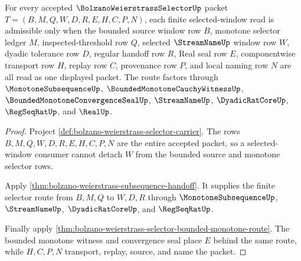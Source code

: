 \begin{theorem}
\label{thm:bolzano-weierstrass-selector-window-obligation}
For every accepted $\BolzanoWeierstrassSelectorUp$ packet $T=(B,M,Q,W,D,R,E,H,C,P,N)$, each finite selected-window read is admissible only when the bounded source window row $B$, monotone selector ledger $M$, inspected-threshold row $Q$, selected $\StreamNameUp$ window row $W$, dyadic tolerance row $D$, regular handoff row $R$, Real seal row $E$, componentwise transport row $H$, replay row $C$, provenance row $P$, and local naming row $N$ are all read as one displayed packet. The route factors through $\MonotoneSubsequenceUp$, $\BoundedMonotoneCauchyWitnessUp$, $\BoundedMonotoneConvergenceSealUp$, $\StreamNameUp$, $\DyadicRatCoreUp$, $\RegSeqRatUp$, and $\RealUp$.
\end{theorem}
\begin{proof}
Project \autoref{def:bolzano-weierstrass-selector-carrier}. The rows $B,M,Q,W,D,R,E,H,C,P,N$ are the entire accepted packet, so a selected-window consumer cannot detach $W$ from the bounded source and monotone selector rows.

Apply \autoref{thm:bolzano-weierstrass-subsequence-handoff}. It supplies the finite selector route from $B,M,Q$ to $W,D,R$ through $\MonotoneSubsequenceUp$, $\StreamNameUp$, $\DyadicRatCoreUp$, and $\RegSeqRatUp$.

Finally apply \autoref{thm:bolzano-weierstrass-selector-bounded-monotone-route}. The bounded monotone witness and convergence seal place $E$ behind the same route, while $H,C,P,N$ transport, replay, source, and name the packet.
\end{proof}


